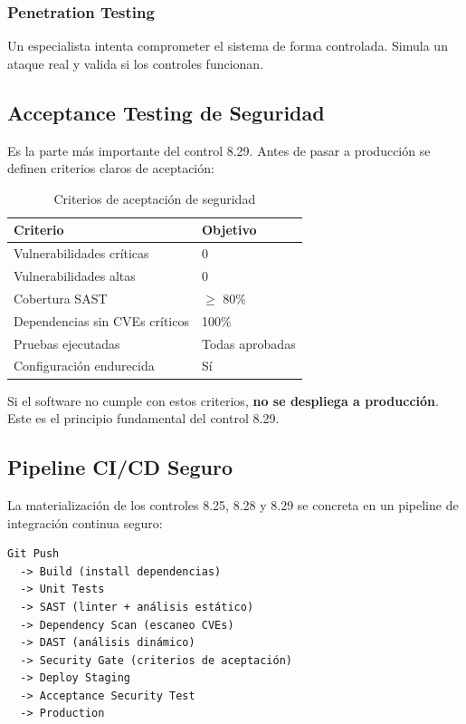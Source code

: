 \subsubsection{Penetration Testing}

Un especialista intenta comprometer el sistema de forma controlada. Simula un ataque real y valida si los controles funcionan.

\subsection{Acceptance Testing de Seguridad}

Es la parte más importante del control 8.29. Antes de pasar a producción se definen criterios claros de aceptación:

\begin{table}[h]
\centering
\small
\begin{tabular}{|l|l|}
\hline
\textbf{Criterio} & \textbf{Objetivo} \\
\hline
Vulnerabilidades críticas & 0 \\
Vulnerabilidades altas & 0 \\
Cobertura SAST & $\geq$ 80\% \\
Dependencias sin CVEs críticos & 100\% \\
Pruebas ejecutadas & Todas aprobadas \\
Configuración endurecida & Sí \\
\hline
\end{tabular}
\caption{Criterios de aceptación de seguridad}
\label{tab:criterios}
\end{table}

Si el software no cumple con estos criterios, \textbf{no se despliega a producción}. Este es el principio fundamental del control 8.29.

\subsection{Pipeline CI/CD Seguro}

La materialización de los controles 8.25, 8.28 y 8.29 se concreta en un pipeline de integración continua seguro:

\begin{lstlisting}[caption={Pipeline CI/CD seguro (modelo genérico)}, basicstyle=\ttfamily\tiny, columns=fullflexible]
Git Push
  -> Build (install dependencias)
  -> Unit Tests
  -> SAST (linter + análisis estático)
  -> Dependency Scan (escaneo CVEs)
  -> DAST (análisis dinámico)
  -> Security Gate (criterios de aceptación)
  -> Deploy Staging
  -> Acceptance Security Test
  -> Production
\end{lstlisting}

